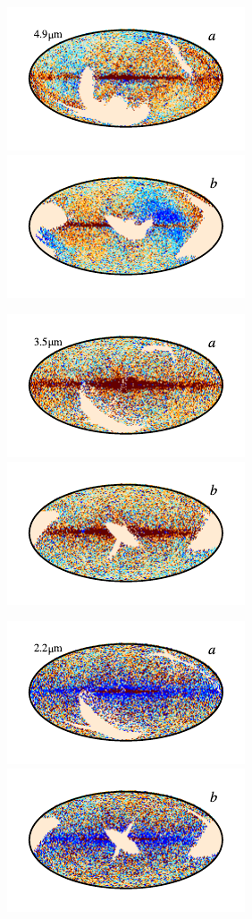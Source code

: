 \documentclass{aa}
\begin{document}
\begin{figure}
  \includegraphics{figs/res_maps/res_04a_c0001_000022.pdf}\includegraphics{figs/res_maps/res_04b_c0001_000022.pdf}
  \vspace*{-0.85cm}
  
  \includegraphics{figs/res_maps/res_03a_c0001_000022.pdf}\includegraphics{figs/res_maps/res_03b_c0001_000022.pdf}
  \vspace*{-0.85cm}  

	\includegraphics{figs/res_maps/res_02a_c0001_000022.pdf}\includegraphics{figs/res_maps/res_02b_c0001_000022.pdf}
  \vspace*{-0.85cm}


\end{figure}
\end{document}
